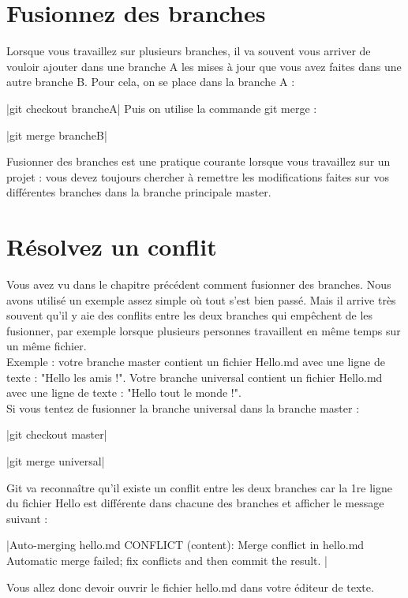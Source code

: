 \section{Fusionnez des branches}

 Lorsque vous travaillez sur plusieurs branches, il va souvent vous arriver de vouloir ajouter  dans une branche A les mises à jour que vous avez faites dans une autre branche B. Pour cela, on se place dans la branche A :

|git checkout brancheA|
Puis on utilise la commande git merge : 

|git merge brancheB|

Fusionner des branches est une pratique courante lorsque vous travaillez sur un projet : vous devez toujours chercher à remettre les modifications faites sur vos différentes branches dans la branche principale master.  

\section{Résolvez un conflit}
Vous avez vu dans le chapitre précédent comment fusionner des branches. Nous avons utilisé un exemple assez simple où tout s'est bien passé. Mais il arrive très souvent qu'il y aie des conflits entre les deux branches qui empêchent de les fusionner, par exemple lorsque plusieurs personnes travaillent en même temps sur un même fichier.\\

Exemple : votre branche master contient un fichier Hello.md avec une ligne de texte : "Hello les amis !". Votre branche universal contient un fichier Hello.md avec une ligne de texte : "Hello tout le monde !".\\

Si vous tentez de fusionner la branche universal dans la branche master :

|git checkout master|

|git merge universal|


Git va reconnaître qu'il existe un conflit entre les deux branches car la 1re ligne du fichier Hello est différente dans chacune des branches et afficher le message suivant : 

|Auto-merging hello.md
CONFLICT (content): Merge conflict in hello.md
Automatic merge failed; fix conflicts and then commit the result.
|

Vous allez donc devoir ouvrir le fichier hello.md dans votre éditeur de texte. \\

